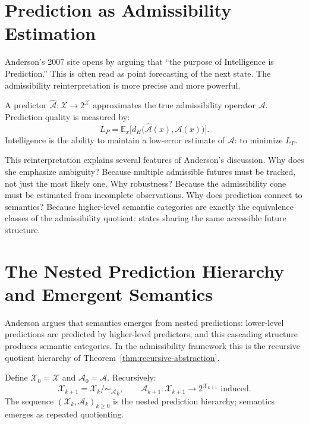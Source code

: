 \documentclass[12pt, a4paper, oneside]{book}
\newcommand{\Adm}{\mathcal{A}}
\newcommand{\X}{\mathcal{X}}
\newcommand{\dH}{d_H}
\newcommand{\SA}{{\sim_{\!\Adm}}}
\begin{document}
\section{Prediction as Admissibility Estimation}

Anderson's 2007 site opens by arguing that ``the purpose of Intelligence
is Prediction.'' This is often read as point forecasting of the next
state. The admissibility reinterpretation is more precise and more
powerful.

\begin{definition}
\label{def:prediction}
A predictor $\hat{\Adm} : \X \to 2^\X$ approximates the true
admissibility operator $\Adm$. Prediction quality is measured by:
\[
  L_P = \mathbb{E}_x\bigl[\dH\bigl(\hat{\Adm}(x), \Adm(x)\bigr)\bigr].
\]
Intelligence is the ability to maintain a low-error estimate of $\Adm$:
to minimize $L_P$.
\end{definition}

\begin{remark}
This reinterpretation explains several features of Anderson's discussion.
Why does she emphasize ambiguity? Because multiple admissible futures
must be tracked, not just the most likely one. Why robustness? Because
the admissibility cone must be estimated from incomplete observations.
Why does prediction connect to semantics? Because higher-level semantic
categories are exactly the equivalence classes of the admissibility
quotient: states sharing the same accessible future structure.
\end{remark}

\section{The Nested Prediction Hierarchy and Emergent Semantics}

Anderson argues that semantics emerges from nested predictions:
lower-level predictions are predicted by higher-level predictors,
and this cascading structure produces semantic categories. In the
admissibility framework this is the recursive quotient hierarchy of
Theorem~\ref{thm:recursive-abstraction}.

\begin{definition}
\label{def:nested-prediction}
Define $\X_0 = \X$ and $\Adm_0 = \Adm$. Recursively:
\[
  \X_{k+1} = \X_k / \SA_k, \qquad
  \Adm_{k+1} : \X_{k+1} \to 2^{\X_{k+1}} \text{ induced}.
\]
The sequence $(\X_k, \Adm_k)_{k \geq 0}$ is the nested prediction
hierarchy; semantics emerges as repeated quotienting.
\end{definition}
\end{document}
